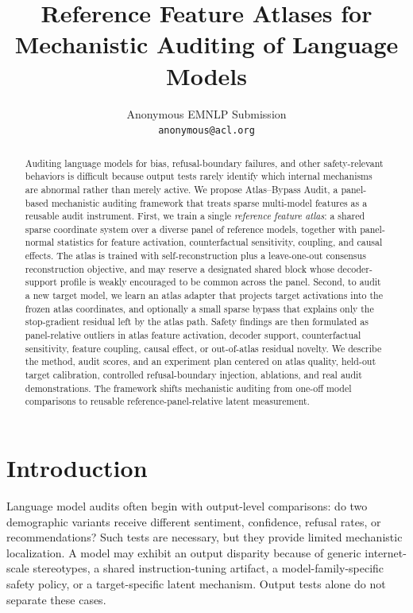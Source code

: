 \documentclass[11pt]{article}
\title{Reference Feature Atlases for Mechanistic Auditing of Language Models}
\author{
  Anonymous EMNLP Submission \\
  \texttt{anonymous@acl.org}
}
\newcommand{\method}{Atlas--Bypass Audit\xspace}
\begin{document}
\maketitle

\begin{abstract}
Auditing language models for bias, refusal-boundary failures, and other safety-relevant behaviors is difficult because output tests rarely identify which internal mechanisms are abnormal rather than merely active. We propose \method, a panel-based mechanistic auditing framework that treats sparse multi-model features as a reusable audit instrument. First, we train a single \emph{reference feature atlas}: a shared sparse coordinate system over a diverse panel of reference models, together with panel-normal statistics for feature activation, counterfactual sensitivity, coupling, and causal effects. The atlas is trained with self-reconstruction plus a leave-one-out consensus reconstruction objective, and may reserve a designated shared block whose decoder-support profile is weakly encouraged to be common across the panel. Second, to audit a new target model, we learn an atlas adapter that projects target activations into the frozen atlas coordinates, and optionally a small sparse bypass that explains only the stop-gradient residual left by the atlas path. Safety findings are then formulated as panel-relative outliers in atlas feature activation, decoder support, counterfactual sensitivity, feature coupling, causal effect, or out-of-atlas residual novelty. We describe the method, audit scores, and an experiment plan centered on atlas quality, held-out target calibration, controlled refusal-boundary injection, ablations, and real audit demonstrations. The framework shifts mechanistic auditing from one-off model comparisons to reusable reference-panel-relative latent measurement.
\end{abstract}

\section{Introduction}

Language model audits often begin with output-level comparisons: do two demographic variants receive different sentiment, confidence, refusal rates, or recommendations? Such tests are necessary, but they provide limited mechanistic localization. A model may exhibit an output disparity because of generic internet-scale stereotypes, a shared instruction-tuning artifact, a model-family-specific safety policy, or a target-specific latent mechanism. Output tests alone do not separate these cases.
\end{document}
